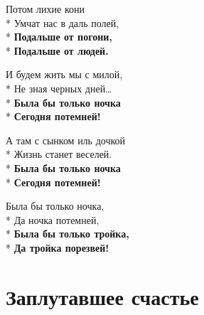 \medskip

\begin{minipage}{\linewidth}
Потом лихие кони\\*
Умчат нас в даль полей,\\*
\textbf{Подальше от погони,}\\*
\textbf{Подальше от людей.}\\
\end{minipage}\par\medskip\nobreak

\medskip

\begin{minipage}{\linewidth}
И будем жить мы с милой,\\*
Не зная черных дней…\\*
\textbf{Была бы только ночка}\\*
\textbf{Сегодня потемней!}\\
\end{minipage}\par\medskip\nobreak

\medskip

\begin{minipage}{\linewidth}
А там с сынком иль дочкой\\*
Жизнь станет веселей.\\*
\textbf{Была бы только ночка}\\*
\textbf{Сегодня потемней!}\\
\end{minipage}\par\medskip\nobreak

\medskip

\begin{minipage}{\linewidth}
Была бы только ночка,\\*
Да ночка потемней,\\*
\textbf{Была бы только тройка,}\\*
\textbf{Да тройка порезвей!}\\
\end{minipage}

\vspace{\fill}\newpage

\section{Заплутавшее счастье}
\label{song:Заплутавшее_счастье}

